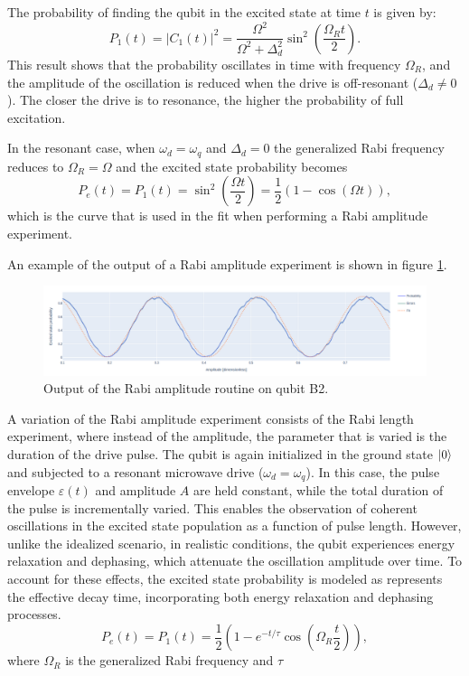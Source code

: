 The probability of finding the qubit in the excited state at time $t$ is given by:
\begin{equation}\label{eq:P1_rabi}
    P_1(t) = |C_1(t)|^2 = \frac{\Omega^2}{\Omega^2 + \Delta_d^2} \sin^2 \left( \frac{\Omega_R t}{2} \right).
\end{equation}
This result shows that the probability oscillates in time with frequency $\Omega_R$, and the amplitude of the oscillation is reduced when the drive is off-resonant ($\Delta_d \neq 0$).
The closer the drive is to resonance, the higher the probability of full excitation.

In the resonant case, when $\omega_d =\omega_q$ and $\Delta_d = 0$ the generalized Rabi frequency reduces to $\Omega_R = \Omega$ and the excited state probability becomes
\begin{equation}\label{eq:rabi_amplitude}
    P_e (t) = P_1(t) = \sin^2\left(\frac{\Omega t}{2} \right) = \frac{1}{2}(1-\cos(\Omega t)),
\end{equation}
which is the curve that is used in the fit when performing a Rabi amplitude experiment.

An example of the output of a Rabi amplitude experiment is shown in figure \ref{fig:rabi_amplitude}.
\begin{figure}[h!]
    \centering
    \includegraphics[width=\textwidth]{figures/png/rabi_amp.png}
    \caption{Output of the Rabi amplitude routine on qubit B2.}
    \label{fig:rabi_amplitude}
\end{figure}

A variation of the Rabi amplitude experiment consists of the Rabi length experiment, where instead of the amplitude, the parameter that is varied is the duration of the drive pulse.
The qubit is again initialized in the ground state $\ket{0}$ and subjected to a resonant microwave drive ($\omega_d = \omega_q$). 
In this case, the pulse envelope $\varepsilon(t)$ and amplitude $A$ are held constant, while the total duration of the pulse is incrementally varied. 
This enables the observation of coherent oscillations in the excited state population as a function of pulse length. 
However, unlike the idealized scenario, in realistic conditions, the qubit experiences energy relaxation and dephasing, which attenuate the oscillation amplitude over time. 
To account for these effects, the excited state probability is modeled as represents the effective decay time, incorporating both energy relaxation and dephasing processes.
\begin{equation}
    P_e (t) = P_1(t)= \frac{1}{2}\left(1- e^{-t/\tau}\cos(\Omega_R \frac{t}{2})\right),
\end{equation}
where $\Omega_R$ is the generalized Rabi frequency and $\tau$ 

